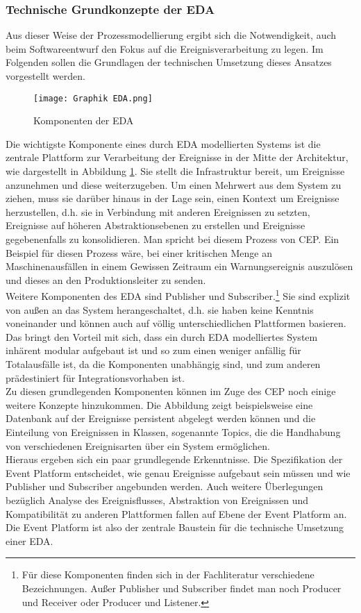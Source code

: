\subsubsection*{Technische Grundkonzepte der \ac{EDA}}
Aus dieser Weise der Prozessmodellierung ergibt sich die Notwendigkeit, auch beim Softwareentwurf den Fokus auf die Ereignisverarbeitung zu legen. Im Folgenden sollen die Grundlagen der technischen Umsetzung dieses Ansatzes vorgestellt werden.
\begin{figure}[H]
  \centering
	\texttt{[image: Graphik EDA.png]}
  \caption[Komponenten der Event-Driven Architecture]{Komponenten der \ac{EDA}\ \cite[][S. 249]{CLOUD2021}}
  \label{EDAbasics}
\end{figure}

Die wichtigste Komponente eines durch \ac{EDA} modellierten Systems ist die zentrale Plattform zur Verarbeitung der Ereignisse in der Mitte der Architektur, wie dargestellt in Abbildung \ref{EDAbasics}. Sie stellt die Infrastruktur bereit, um Ereignisse anzunehmen und diese weiterzugeben. Um einen Mehrwert aus dem System zu ziehen, muss sie darüber hinaus in der Lage sein, einen Kontext um Ereignisse herzustellen, d.h. sie in Verbindung mit anderen Ereignissen zu setzten, Ereignisse auf höheren Abstraktionsebenen zu erstellen und Ereignisse gegebenenfalls zu konsolidieren. Man spricht bei diesem Prozess von \ac{CEP}. Ein Beispiel für diesen Prozess wäre, bei einer kritischen Menge an Maschinenausfällen in einem Gewissen Zeitraum ein Warnungsereignis auszulösen und dieses an den Produktionsleiter zu senden.\\
Weitere Komponenten des \ac{EDA} sind Publisher und Subscriber.\footnote{Für diese Komponenten finden sich in der Fachliteratur verschiedene Bezeichnungen. Außer Publisher und Subscriber findet man noch Producer und Receiver oder Producer und Listener.} Sie sind explizit von außen an das System herangeschaltet, d.h. sie haben keine Kenntnis voneinander und können auch auf völlig unterschiedlichen Plattformen basieren. Das bringt den Vorteil mit sich, dass ein durch \ac{EDA} modelliertes System inhärent modular aufgebaut ist und so zum einen weniger anfällig für Totalausfälle ist, da die Komponenten unabhängig sind, und zum anderen prädestiniert für Integrationsvorhaben ist.\\
Zu diesen grundlegenden Komponenten können im Zuge des \ac{CEP} noch einige weitere Konzepte hinzukommen. Die Abbildung zeigt beispielsweise eine Datenbank auf der Ereignisse persistent abgelegt werden können und die Einteilung von Ereignissen in Klassen, sogenannte Topics, die die Handhabung von verschiedenen Ereignisarten über ein System ermöglichen.\\
Hieraus ergeben sich ein paar grundlegende Erkenntnisse. Die Spezifikation der Event Platform entscheidet, wie genau Ereignisse aufgebaut sein müssen und wie Publisher und Subscriber angebunden werden. Auch weitere Überlegungen bezüglich Analyse des Ereignisflusses, Abstraktion von Ereignissen und Kompatibilität zu anderen Plattformen fallen auf Ebene der Event Platform an. Die Event Platform ist also der zentrale Baustein für die technische Umsetzung einer \ac{EDA}. \cite[Vgl. ][S. 244]{CLOUD2021}
